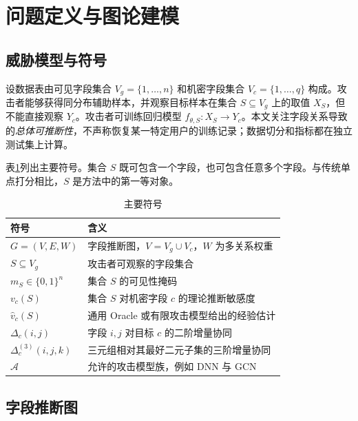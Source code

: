 \documentclass[UTF8,a4paper,zihao=5,fontset=fandol]{ctexart}
\begin{document}
\section{问题定义与图论建模}

\subsection{威胁模型与符号}

设数据表由可见字段集合 $V_g=\{1,\dots,n\}$ 和机密字段集合 $V_c=\{1,\dots,q\}$ 构成。攻击者能够获得同分布辅助样本，并观察目标样本在集合 $S\subseteq V_g$ 上的取值 $X_S$，但不能直接观察 $Y_c$。攻击者可训练回归模型 $f_{\theta,S}:X_S\rightarrow Y_c$。本文关注字段关系导致的\emph{总体可推断性}，不声称恢复某一特定用户的训练记录；数据切分和指标都在独立测试集上计算。

表\ref{tab:notation}列出主要符号。集合 $S$ 既可包含一个字段，也可包含任意多个字段。与传统单点打分相比，$S$ 是方法中的第一等对象。

\begin{table}[H]
  \centering
  \caption{主要符号}
  \label{tab:notation}
  \begin{tabularx}{0.94\textwidth}{@{}lX@{}}
    \toprule
    符号 & 含义\\
    \midrule
    $G=(V,E,W)$ & 字段推断图，$V=V_g\cup V_c$，$W$ 为多关系权重\\
    $S\subseteq V_g$ & 攻击者可观察的字段集合\\
    $m_S\in\{0,1\}^{n}$ & 集合 $S$ 的可见性掩码\\
    $v_c(S)$ & 集合 $S$ 对机密字段 $c$ 的理论推断敏感度\\
    $\widehat v_c(S)$ & 通用 Oracle 或有限攻击模型给出的经验估计\\
    $\Delta_c(i,j)$ & 字段 $i,j$ 对目标 $c$ 的二阶增量协同\\
    $\Delta_c^{(3)}(i,j,k)$ & 三元组相对其最好二元子集的三阶增量协同\\
    $\mathcal A$ & 允许的攻击模型族，例如 DNN 与 GCN\\
    \bottomrule
  \end{tabularx}
\end{table}

\subsection{字段推断图}
\end{document}
